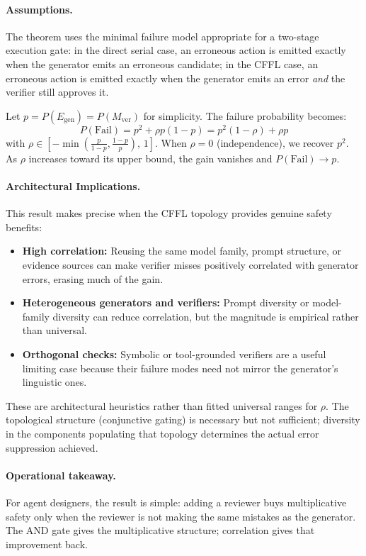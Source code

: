 \paragraph{Assumptions.}
The theorem uses the minimal failure model appropriate for a two-stage execution gate: in the direct serial case, an erroneous action is emitted exactly when the generator emits an erroneous candidate; in the CFFL case, an erroneous action is emitted exactly when the generator emits an error \emph{and} the verifier still approves it.

\begin{corollary}\label{cor:correlation-degradation}
Let $p = P(E_{\mathrm{gen}}) = P(M_{\mathrm{ver}})$ for simplicity. The failure probability becomes:
\[
P(\mathrm{Fail}) = p^2 + \rho p(1-p) = p^2(1-\rho) + \rho p
\]
with $\rho \in \left[-\min\!\left(\frac{p}{1-p},\frac{1-p}{p}\right),\,1\right]$. When $\rho = 0$ (independence), we recover $p^2$. As $\rho$ increases toward its upper bound, the gain vanishes and $P(\mathrm{Fail}) \to p$.
\end{corollary}

\paragraph{Architectural Implications.}
This result makes precise when the CFFL topology provides genuine safety benefits:
\begin{itemize}[leftmargin=*]
\item \textbf{High correlation:} Reusing the same model family, prompt structure, or evidence sources can
make verifier misses positively correlated with generator errors, erasing much of the gain.
\item \textbf{Heterogeneous generators and verifiers:} Prompt diversity or model-family diversity can
reduce correlation, but the magnitude is empirical rather than universal.
\item \textbf{Orthogonal checks:} Symbolic or tool-grounded verifiers are a useful limiting case because
their failure modes need not mirror the generator's linguistic ones.
\end{itemize}
These are architectural heuristics rather than fitted universal ranges for $\rho$. The topological structure
(conjunctive gating) is necessary but not sufficient; diversity in the components populating that topology
determines the actual error suppression achieved.

\paragraph{Operational takeaway.}
For agent designers, the result is simple: adding a reviewer buys multiplicative safety only when the reviewer is not making the same mistakes as the generator. The AND gate gives the multiplicative structure; correlation gives that improvement back.

